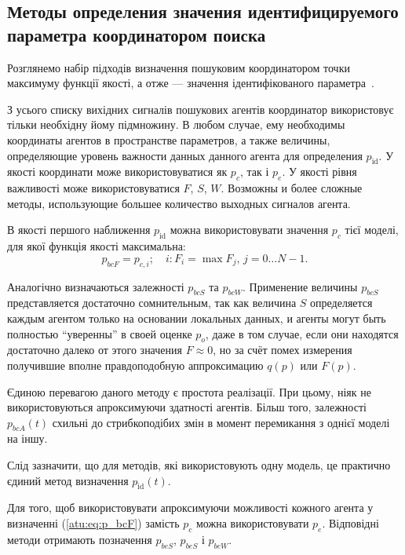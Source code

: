 \subsection{Методы определения значения идентифицируемого параметра координатором поиска} %


Розглянемо набір підходів визначення пошуковим координатором точки максимуму
функції якості, а отже --- значення ідентифікованого
параметра~\cite{atu_st99,atu_jacs2015,atu_st103}.


З усього списку вихідних сигналів пошукових агентів координатор використовує
тільки необхідну йому підмножину.
%
В любом случае, ему необходимы координаты агентов в пространстве параметров, а также величины,
определяющие уровень важности данных данного агента для определения $p_\mathrm{id}$.
%
У якості координати може використовуватися як $p_c$, так і $p_e$.
У якості рівня важливості може використовуватися $F$, $S$, $W$.
%
Возможны и более сложные методы, использующие большее
количество выходных сигналов агента.

В якості першого наближення $p_\mathrm{id}$ можна  використовувати
значення $p_c$ тієї моделі, для якої функція якості максимальна:
%
\begin{equation}
  p_{bcF}
  =
  p_{c,i};
  \quad
  i : F_i = \max{F_j}, \, j=0 \ldots N-1 .
  \label{atu:eq:p_bcF}
\end{equation}

Аналогічно визначаються залежності
$p_{bcS}$ та $p_{bcW}$.
%
Применение величины $p_{bcS}$ представляется достаточно сомнительным,
так как величина $S$ определяется каждым агентом только на основании
локальных данных, и агенты могут быть полностью ``уверенны''
в своей оценке $p_o$, даже в том случае, если они находятся
достаточно далеко от этого значения $F \approx 0$,
но за счёт помех измерения получившие вполне правдоподобную аппроксимацию
$q(p)$ или $F(p)$.

Єдиною перевагою даного методу є простота реалізації. При цьому, ніяк не
використовуються апроксимуючи здатності агентів. Більш того, залежності
$p_{bcA} (t)$ схильні до стрибкоподібих змін в момент перемикання з однієї моделі
на іншу.

Слід зазначити, що для методів, які використовують одну модель, це
практично єдиний метод визначення
$p_\mathrm{id}(t)$.

Для того, щоб використовувати апроксимуючи можливості кожного агента у
визначенні (\ref{atu:eq:p_bcF}) замість $p_c$ можна використовувати $ p_e$.
Відповідні методи отримають позначення $p_{beS}$, $p_{beS} $ і $p_{beW}$.

